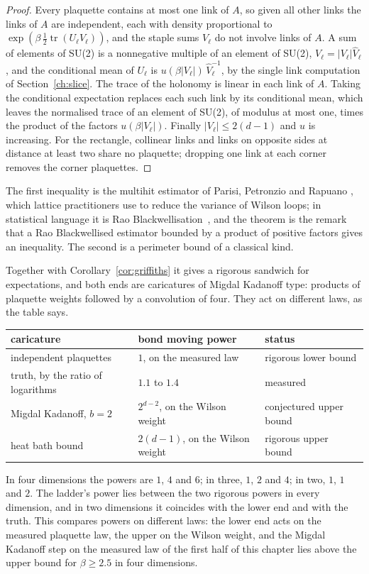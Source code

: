 \begin{proof}
Every plaquette contains at most one link of $A$, so given all other links the links of $A$ are independent, each with density proportional to $\exp(\beta\,\frac12\operatorname{tr}(U_\ell V_\ell))$, and the staple sums $V_\ell$ do not involve links of $A$. A sum of elements of SU(2) is a nonnegative multiple of an element of SU(2), $V_\ell=|V_\ell|\hat V_\ell$, and the conditional mean of $U_\ell$ is $u(\beta|V_\ell|)\,\hat V_\ell^{-1}$, by the single link computation of Section~\ref{ch:slice}. The trace of the holonomy is linear in each link of $A$. Taking the conditional expectation replaces each such link by its conditional mean, which leaves the normalised trace of an element of SU(2), of modulus at most one, times the product of the factors $u(\beta|V_\ell|)$. Finally $|V_\ell|\le2(d-1)$ and $u$ is increasing. For the rectangle, collinear links and links on opposite sides at distance at least two share no plaquette; dropping one link at each corner removes the corner plaquettes.
\end{proof}

The first inequality is the multihit estimator of Parisi, Petronzio and Rapuano \cite{PPR}, which lattice practitioners use to reduce the variance of Wilson loops; in statistical language it is Rao Blackwellisation~\cite{Bl47}, and the theorem is the remark that a Rao Blackwellised estimator bounded by a product of positive factors gives an inequality. The second is a perimeter bound of a classical kind.

Together with Corollary~\ref{cor:griffiths} it gives a rigorous sandwich for expectations, and both ends are caricatures of Migdal Kadanoff type: products of plaquette weights followed by a convolution of four. They act on different laws, as the table says.
\begin{center}
\small
\begin{tabular}{p{1.4in}p{1.35in}p{1.35in}}
\toprule
caricature & bond moving power & status \\ \midrule
independent plaquettes & $1$, on the measured law & rigorous lower bound \\
truth, by the ratio of logarithms & $1.1$ to $1.4$ & measured \\
Migdal Kadanoff, $b=2$ & $2^{d-2}$, on the Wilson weight & conjectured upper bound \\
heat bath bound & $2(d-1)$, on the Wilson weight & rigorous upper bound \\
\bottomrule
\end{tabular}
\end{center}
In four dimensions the powers are $1$, $4$ and $6$; in three, $1$, $2$ and $4$; in two, $1$, $1$ and $2$. The ladder's power lies between the two rigorous powers in every dimension, and in two dimensions it coincides with the lower end and with the truth. This compares powers on different laws: the lower end acts on the measured plaquette law, the upper on the Wilson weight, and the Migdal Kadanoff step on the measured law of the first half of this chapter lies above the upper bound for $\beta\ge2.5$ in four dimensions.

